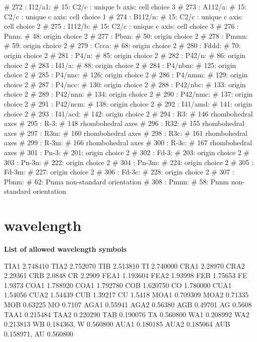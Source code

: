 \begin{MacVerbatim}
# 272 : I12/a1:     #  15: C2/c : unique b axis: cell choice 3
# 273 : A112/a:     #  15: C2/c : unique c axis: cell choice 1
# 274 : B112/n:     #  15: C2/c : unique c axis: cell choice 2
# 275 : I112/b:     #  15: C2/c : unique c axis: cell choice 3
# 276 : Pnnn:       #  48: origin choice 2
# 277 : Pban:       #  50: origin choice 2
# 278 : Pmmn:       #  59: origin choice 2
# 279 : Ccca:       #  68: origin choice 2
# 280 : Fddd:       #  70: origin choice 2
# 281 : P4/n:       #  85: origin choice 2
# 282 : P42/n:      #  86: origin choice 2
# 283 : I41/a:      #  88: origin choice 2
# 284 : P4/nbm:     # 125: origin choice 2
# 285 : P4/nnc:     # 126: origin choice 2
# 286 : P4/nmm:     # 129: origin choice 2
# 287 : P4/ncc:     # 130: origin choice 2
# 288 : P42/nbc:    # 133: origin choice 2
# 289 : P42/nnn:    # 134: origin choice 2
# 290 : P42/nmc:    # 137: origin choice 2
# 291 : P42/ncm:    # 138: origin choice 2
# 292 : I41/amd:    # 141: origin choice 2
# 293 : I41/acd:    # 142: origin choice 2
# 294 : R3:         # 146 rhombohedral axes
# 295 : R-3:        # 148 rhombohedral axes
# 296 : R32:        # 155 rhombohedral axes
# 297 : R3m:        # 160 rhombohedral axes
# 298 : R3c:        # 161 rhombohedral axes
# 299 : R-3m:       # 166 rhombohedral axes
# 300 : R-3c:       # 167 rhombohedral axes
# 301 : Pn-3:       # 201: origin choice 2
# 302 : Fd-3:       # 203: origin choice 2
# 303 : Pn-3n:      # 222: origin choice 2
# 304 : Pn-3m:      # 224: origin choice 2
# 305 : Fd-3m:      # 227: origin choice 2
# 306 : Fd-3c:      # 228: origin choice 2
# 307 : Pbnm:       #  62: Pnma non-standard orientation
# 308 : Pmnn:       #  58: Pnnm non-standard orientation
\end{MacVerbatim}
\section{wavelength}
{\bf List of allowed wavelength symbols \par }
\par
\begin{MacVerbatim}
TIA1   2.748410    TIA2   2.752070     TIB    2.513810     TI     2.740000
CRA1   2.28970     CRA2   2.29361      CRB    2.0848       CR     2.2909
FEA1   1.193604    FEA2   1.93998      FEB    1.75653      FE     1.9373
COA1   1.788920    COA1   1.792780     COB    1.620750     CO     1.780000
CUA1   1.54056     CUA2   1.54439      CUB    1.39217      CU     1.5418
MOA1   0.709309    MOA2   0.71335      MOB    0.63225      MO     0.7107
AGA1   0.55941     AGA2   0.56380      AGB    0.49701      AG     0.5608
TAA1   0.215484    TAA2   0.220290     TAB    0.190076     TA     0.560800
WA1    0.208992    WA2    0.213813     WB     0.184363,    W      0.560800
AUA1   0.180185    AUA2   0.185064     AUB    0.158971,    AU     0.560800
\end{MacVerbatim}
